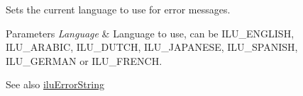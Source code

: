 Sets the current language to use for error messages. 


\begin{DoxyParams}{Parameters}
{\em Language} & Language to use, can be I\+L\+U\+\_\+\+E\+N\+G\+L\+I\+S\+H, I\+L\+U\+\_\+\+A\+R\+A\+B\+I\+C, I\+L\+U\+\_\+\+D\+U\+T\+C\+H, I\+L\+U\+\_\+\+J\+A\+P\+A\+N\+E\+S\+E, I\+L\+U\+\_\+\+S\+P\+A\+N\+I\+S\+H, I\+L\+U\+\_\+\+G\+E\+R\+M\+A\+N or I\+L\+U\+\_\+\+F\+R\+E\+N\+C\+H. \\
\hline
\end{DoxyParams}
\begin{DoxySeeAlso}{See also}
\hyperlink{group__ilu__util_gaa899a04791dfb88d8b48c823998af427}{ilu\+Error\+String} 
\end{DoxySeeAlso}
